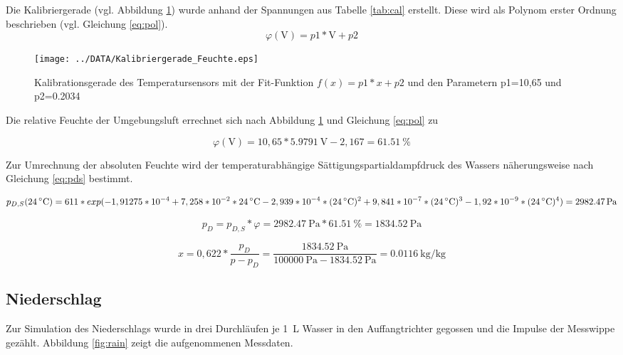 Die Kalibriergerade (vgl. Abbildung \ref{fig:cal2}) wurde anhand der Spannungen aus Tabelle \ref{tab:cal} erstellt. Diese wird als Polynom erster Ordnung beschrieben (vgl. Gleichung \ref{eq:pol}).
\begin{equation}
	\label{eq:pol}
	\varphi(\text{V}) = p1*\text{V} + p2
\end{equation}

\begin{figure}[H]
	\centering
	\texttt{[image: ../DATA/Kalibriergerade\_Feuchte.eps]}
	\caption[Kalibrationsgerade des Temperatursensors]{Kalibrationsgerade des Temperatursensors mit der Fit-Funktion $f(x) = p1*x + p2$ und den Parametern p1=10,65 und p2=0.2034}
	\label{fig:cal2}
\end{figure}

Die relative Feuchte der Umgebungsluft errechnet sich nach Abbildung \ref{fig:cal2} und Gleichung \ref{eq:pol} zu

\begin{equation}
	\label{eq:cal}
	\varphi(\text{V})=10,65*\SI{5,9791}{\volt}-2,167=\SI{61,51}{\percent}
\end{equation}

Zur Umrechnung der absoluten Feuchte wird der temperaturabhängige Sättigungspartialdampfdruck des Wassers näherungsweise nach Gleichung \ref{eq:pds} bestimmt. 

\begin{equation}
	\label{eq:pds}
	p_{D,S}(\SI{24}{\celsius}) = 611*exp(-1,91275*10^{-4}+7,258*10^{-2}*\SI{24}{\celsius}-2,939*10^{-4}*(\SI{24}{\celsius})^2\linebreak+9,841*10^{-7}*(\SI{24}{\celsius})^3-1,92*10^{-9}*(\SI{24}{\celsius})^4)=\SI{2982,47}{\pascal}
\end{equation}

\begin{equation}
\label{eq:pd}
p_D=p_{D,S}*\varphi= \SI{2982,47}{\pascal}*\SI{61,51}{\percent}=\SI{1834,52}{\pascal}	
\end{equation}

\begin{equation}
	\label{eq:x}
	x=0,622*\frac{p_D}{p-p_D}=\frac{\SI{1834,52}{\pascal}}{\SI{100000}{\pascal}-\SI{1834,52}{\pascal}}=\SI{0,0116}{\kilogram\per\kilogram}
\end{equation}

		
\subsection{Niederschlag}
Zur Simulation des Niederschlags wurde in drei Durchläufen je \SI{1}{\liter} Wasser in den Auffangtrichter gegossen und die Impulse der Messwippe gezählt. Abbildung \ref{fig:rain} zeigt die aufgenommenen Messdaten. 

